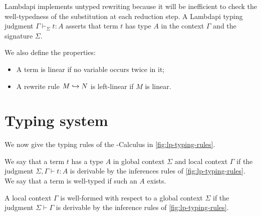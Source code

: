 Lambdapi implements untyped rewriting because it will be inefficient to check the well-typedness of the substitution at each reduction step.
A Lambdapi typing judgment $\Gamma \vdash_\Sigma t : A$ asserts that term $t$ has type $A$ in the context $\Gamma$ and the signature $\Sigma$.

\begin{definition}[Linearity]
We also define the properties:
\begin{itemize}
\item A term is linear if no variable occurs twice in it;
\item A rewrite rule $M \hookrightarrow N$ is left-linear if $M$ is linear.
\end{itemize}
\end{definition}

\section{Typing system}
\label{sect:lambdapi}

We now give the typing rules of the \lpm{}-Calculus in \cref{fig:lp-typing-rules}. 

\begin{definition}
We say that a term $t$ has a type $A$ in global context $\Sigma$ and local context $\Gamma$ if the judgment $\Sigma,\Gamma \vdash t: A$ is
derivable by the inferences rules of \cref{fig:lp-typing-rules}. We say that a term is well-typed if such an $A$ exists.
\end{definition}

\begin{definition}
A local context $\Gamma$ is well-formed with respect to a global context $\Sigma$ if the judgment $\Sigma \vdash \Gamma$ is derivable by the inference rules of \cref{fig:lp-typing-rules}.
\end{definition}


